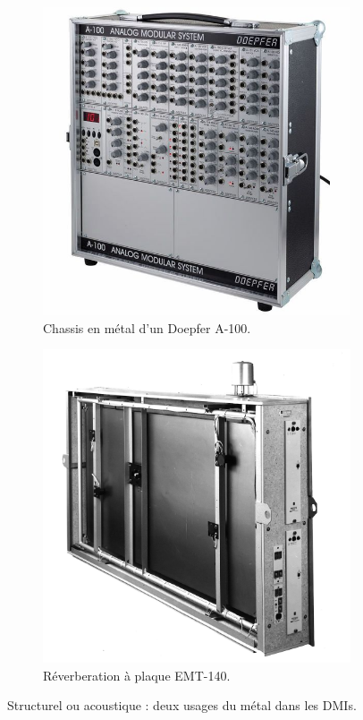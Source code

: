 \begin{itemize}[noitemsep]
\begin{figure}[!htbp]
{\begin{subfigure}[b]{.5\textwidth}
				\includegraphics[width=\linewidth]{gfx/05_interfaces/Doepfer-A100.jpg}
				\caption[Le modulaire Doepfer A-100]{Chassis en métal d'un Doepfer A-100.}
			\label{fig:interface:d-box}
			\end{subfigure}%
			\begin{subfigure}[b]{.5\textwidth}
				\centering
		    	\includegraphics[width=\linewidth]{gfx/05_interfaces/PlateReverb-EMT_140.jpg}
				\caption[Réverberation à plaque EMT_140]{Réverberation à plaque EMT-140.}
				\label{fig:interface:soundplane}
			\end{subfigure}%
		}
		\caption{Structurel ou acoustique : deux usages du métal dans les \glspl{DMI}.}
	\end{figure}


\end{itemize}
